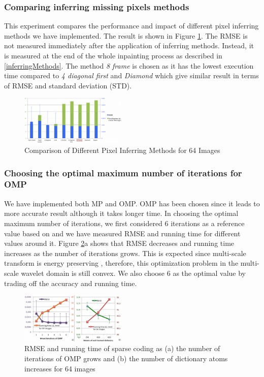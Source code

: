 \documentclass[conference]{IEEEtran}
\begin{document}
\subsubsection{Comparing inferring missing pixels methods}
This experiment compares the performance and impact of different pixel inferring methods we have implemented. The result is shown in Figure \ref{inferringComparisonPlot}. The RMSE is not measured immediately after the application of inferring methods. Instead, it is measured at the end of the whole inpainting process as described in \ref{inferringMethods}. The method \textit{8 frame} is chosen as it has the lowest execution time compared to \textit{4 diagonal first} and \textit{Diamond} which give similar result in terms of RMSE and standard deviation (STD).
\begin{figure}[h]
\centering
\includegraphics[width=0.45\textwidth]{filling_methods_plot_smaller}
\caption{Comparison of Different Pixel Inferring Methods for 64 Images}
\label{inferringComparisonPlot}
\end{figure}

\subsubsection{Choosing the optimal maximum number of iterations for OMP}
We have implemented both MP and OMP. OMP has been chosen since it leads to more accurate result although it takes longer time. In choosing the optimal maximum number of iterations, we first considered 6 iterations as a reference value based on \cite{imageInpaintingAlgo} and we have measured RMSE and running time for different values around it. Figure \ref{iterations_omp}a shows that RMSE decreases and running time increases as the number of iterations grows. This is expected since multi-scale transform is energy preserving \cite{multiscaleDictLearning}, therefore, this optimization problem in the multi-scale wavelet domain is still convex. We also choose 6 as the optimal value by trading off the accuracy and running time.

\begin{figure}[h]
\centering
\includegraphics[width=0.45\textwidth]{atoms_omp_together_small}
\caption{RMSE and running time of sparse coding as (a) the number of iterations of OMP grows and (b) the number of dictionary atoms increases for 64 images}
\label{iterations_omp}
\end{figure}
\end{document}
